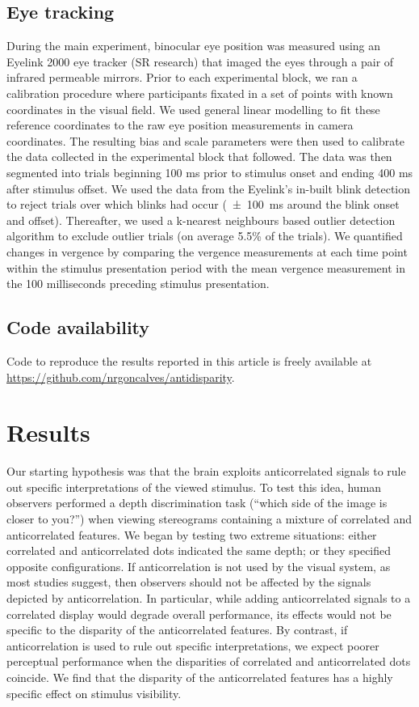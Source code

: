\subsection{Eye tracking}
During the main experiment, binocular eye position was measured using an Eyelink 2000 eye tracker (SR research) that imaged the eyes through a pair of infrared permeable mirrors. Prior to each experimental block, we ran a calibration procedure where participants fixated in a set of points with known coordinates in the visual field. We used general linear modelling to fit these reference coordinates to the raw eye position measurements in camera coordinates. The resulting bias and scale parameters were then used to calibrate the data collected in the experimental block that followed. The data was then segmented into trials beginning 100 ms prior to stimulus onset and ending 400 ms after stimulus offset. We used the data from the Eyelink's in-built blink detection to reject trials over which blinks had occur (\SI{\pm 100}{ms} around the blink onset and offset). Thereafter, we used a k-nearest neighbours based outlier detection algorithm to exclude outlier trials (on average 5.5\% of the trials). We quantified changes in vergence by comparing the vergence measurements at each time point within the stimulus presentation period with the mean vergence measurement in the 100 milliseconds preceding stimulus presentation.

\subsection{Code availability}
Code to reproduce the results reported in this article is freely available at \url{https://github.com/nrgoncalves/antidisparity}.


\section{Results}

Our starting hypothesis was that the brain exploits anticorrelated signals to rule out specific interpretations of the viewed stimulus. To test this idea, human observers performed a depth discrimination task (``which side of the image is closer to you?'') when viewing stereograms containing a mixture of correlated and anticorrelated features. We began by testing two extreme situations: either correlated and anticorrelated dots indicated the same depth; or they specified opposite configurations. If anticorrelation is not used by the visual system, as most studies suggest\cite{Read:2005no}, then observers should not be affected by the signals depicted by anticorrelation. In particular, while adding anticorrelated signals to a correlated display would degrade overall performance, its effects would not be specific to the disparity of the anticorrelated features. By contrast, if anticorrelation is used to rule out specific interpretations, we expect poorer perceptual performance when the disparities of correlated and anticorrelated dots coincide. We find that the disparity of the anticorrelated features has a highly specific effect on stimulus visibility.

